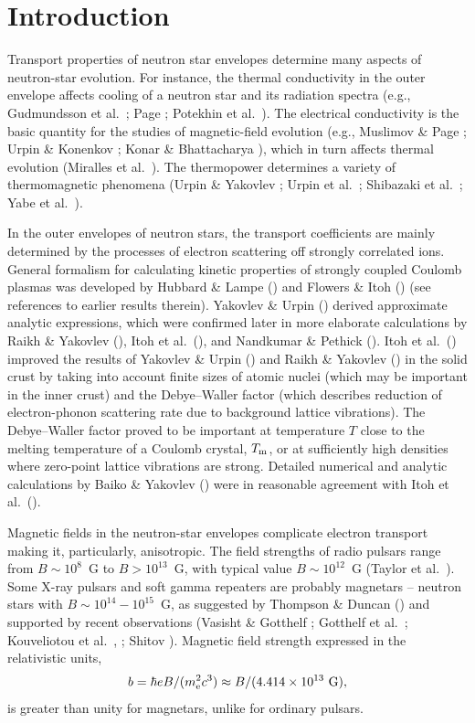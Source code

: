 \documentclass{aa}
\newcommand{\beq}{\begin{equation}}
\newcommand{\eeq}{\end{equation}}
\newcommand{\mel}{m_{\rm e}}
\begin{document}
\section{Introduction}
\label{sect-intro}
%
Transport properties of neutron star envelopes
determine many aspects of neutron-star evolution.
For instance, the thermal conductivity
in the outer envelope affects cooling of a neutron star and
its radiation spectra
(e.g., Gudmundsson et al.\ \cite{gpe83}; Page \cite{page97};
Potekhin et al.\ \cite{pcy97}).
The electrical conductivity is the basic quantity
for the studies of magnetic-field evolution
(e.g., Muslimov \& Page \cite{mp96};
Urpin \& Konenkov \cite{uk97}; Konar \& Bhattacharya \cite{kb97}),
which in turn affects thermal evolution
(Miralles et al.\ \cite{muk98}).
The thermopower determines a variety of thermomagnetic phenomena
(Urpin \& Yakovlev \cite{uy80'}; Urpin et al.\ \cite{uly86};
Shibazaki et al.\ \cite{shibazaki-ea89}; Yabe et al.\ \cite{ysh91}).

In the outer envelopes
of neutron stars, the transport coefficients are mainly determined
by the processes of electron scattering off strongly correlated ions.
General formalism for calculating kinetic properties of 
strongly coupled Coulomb plasmas
was developed by Hubbard \& Lampe (\cite{hl69})
and Flowers \& Itoh (\cite{fi76})
(see references to earlier results therein).
Yakovlev \& Urpin (\cite{yu80}) derived
approximate analytic expressions, which were
confirmed later in more elaborate calculations
by Raikh \& Yakovlev (\cite{ry82}),
Itoh et al.\ (\cite{itoh-ea83}), and
Nandkumar \& Pethick (\cite{np84}).
Itoh et al.\ (\cite{itoh-ea84,itoh-ea93}) improved
the results of Yakovlev \& Urpin (\cite{yu80})
and Raikh \& Yakovlev (\cite{ry82}) in the solid crust
by taking into account finite sizes of atomic nuclei
(which may be important in the inner crust)
and the Debye--Waller factor
(which describes reduction of electron-phonon scattering rate
due to background
lattice vibrations). The Debye--Waller factor
proved to be important at temperature $T$ close to the
melting temperature of a Coulomb crystal, $T_{\rm m}$,
or at sufficiently high densities
where zero-point lattice vibrations are strong.
Detailed numerical and analytic calculations by
Baiko \& Yakovlev (\cite{bya95,bya96}) were in reasonable agreement
with Itoh et al.\ (\cite{itoh-ea84,itoh-ea93}).

Magnetic fields in the neutron-star envelopes
complicate electron transport making it,
particularly, an\-is\-o\-tropic.
The field strengths of radio pulsars range from $B\sim10^8$~G
to $B > 10^{13}$~G, with typical value $B\sim10^{12}$~G
(Taylor et al.\ \cite{tml93}).
Some X-ray pulsars and soft gamma repeaters are probably magnetars
-- neutron stars with $B\sim10^{14}-10^{15}$~G,
as suggested by Thompson \& Duncan (\cite{td95})
and supported by recent observations
(Vasisht \& Gotthelf \cite{vg97}; Gotthelf et al.\ \cite{gvd99};
Kouveliotou et al.\ \cite{kou-ea98}, \cite{kou-ea99};
Shitov \cite{shitov99}).
Magnetic field strength expressed in the relativistic units,
\beq
   b = \hbar eB/(\mel^2 c^3) \approx B/(4.414\times10^{13}{\rm~G}),
\eeq
is greater than unity for magnetars, unlike for ordinary pulsars.
\end{document}
